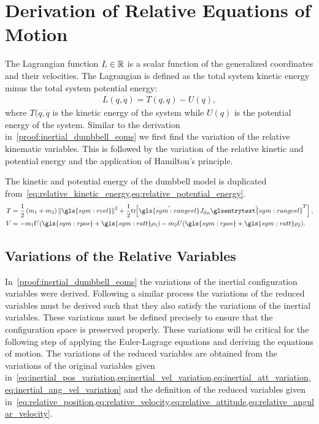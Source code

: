 
\chapter{Derivation of Relative Equations of Motion}\label{proof:relative_dumbbell_eoms}
The Lagrangian function \( L \in \mathbb{R} \) is a scalar function of the generalized coordinates and their velocities.
The Lagrangian is defined as the total system kinetic energy minus the total system potential energy:
\begin{align*}
    L(q, \dot{q} ) = T(q, \dot{q}) - U (q) ,
\end{align*}
where \( T(q, \dot{q} \) is the kinetic energy of the system while \( U(q) \) is the potential energy of the system.
Similar to the derivation in~\cref{proof:inertial_dumbbell_eoms} we first find  the variation of the relative kinematic variables.
This is followed by the variation of the relative kinetic and potential energy and the application of Hamilton's principle.

The kinetic and potential energy of the dumbbell model is duplicated from~\cref{eq:relative_kinetic_energy,eq:relative_potential_energy}.
\begin{align*}
    T &= \frac{1}{2} \parenth{m_1 + m_2} \norm{\gls{sym:rvel}}^2 + \frac{1}{2} \tr{\hat{\gls{sym:rangvel}} J_{d_R} \hat{\glsentrytext{sym:rangvel}}^T},\\
    V &= -m_1 U( \gls{sym:rpos} + \gls{sym:ratt} \vc{\rho}_1) - m_2 U(\gls{sym:rpos} + \gls{sym:ratt} \vc{\rho}_2).
\end{align*}

\section{Variations of the Relative Variables}\label{sec:relative_variations}
In~\cref{proof:inertial_dumbbell_eoms} the variations of the inertial configuration variables were derived.
Following a similar process the variations of the reduced variables must be derived such that they also satisfy the variations of the inertial variables.
These variations must be defined precisely to ensure that the configuration space is preserved properly. 
These variations will be critical for the following step of applying the Euler-Lagrage equations and deriving the equations of motion.
The variations of the reduced variables are obtained from the variations of the original variables given in~\cref{eq:inertial_pos_variation,eq:inertial_vel_variation,eq:inertial_att_variation,eq:inertial_ang_vel_variation} and the definition of the reduced variables given in~\cref{eq:relative_position,eq:relative_velocity,eq:relative_attitude,eq:relative_angular_velocity}.


